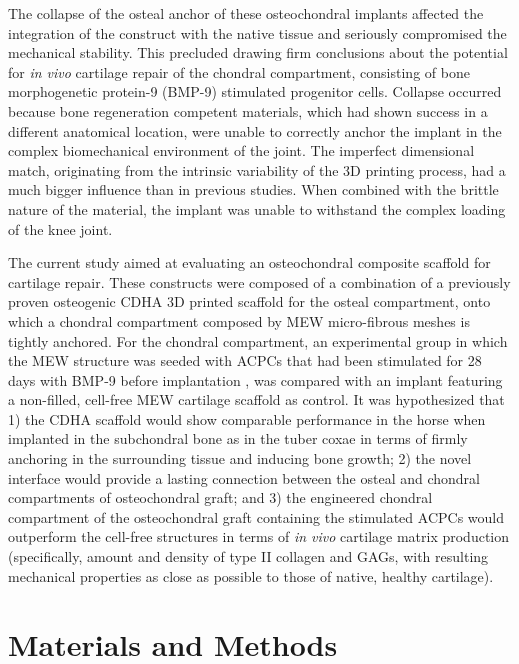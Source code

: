 \documentclass[twocolumn, empirical, authordate, issue]{jote-new-article}
\begin{document}
\begin{takeHomeMessage}
The collapse of the osteal anchor of these osteochondral implants affected the integration of the construct with the native tissue and seriously compromised the mechanical stability. This precluded drawing firm conclusions about the potential for \emph{in vivo} cartilage repair of the chondral compartment, consisting of bone morphogenetic protein-9 (BMP-9) stimulated progenitor cells. Collapse occurred because bone regeneration competent materials, which had shown success in a different anatomical location, were unable to correctly anchor the implant in the complex biomechanical environment of the joint. The imperfect dimensional match, originating from the intrinsic variability of the 3D printing process, had a much bigger influence than in previous studies. When combined with the brittle nature of the material, the implant was unable to withstand the complex loading of the knee joint.
\end{takeHomeMessage}
The current study aimed at evaluating an osteochondral composite scaffold for cartilage repair. These constructs were composed of a combination of a previously proven osteogenic CDHA 3D printed scaffold for the osteal compartment, onto which a chondral compartment composed by MEW micro-fibrous meshes is tightly anchored. For the chondral compartment, an experimental group in which the MEW structure was seeded with ACPCs that had been stimulated for 28 days with BMP-9 before implantation \parencite{Abinzano2018}, was compared with an implant featuring a non-filled, cell-free MEW cartilage scaffold as control. It was hypothesized that 1) the CDHA scaffold would show comparable performance in the horse when implanted in the subchondral bone as in the tuber coxae in terms of firmly anchoring in the surrounding tissue and inducing bone growth; 2) the novel interface would provide a lasting connection between the osteal and chondral compartments of osteochondral graft; and 3) the engineered chondral compartment of the osteochondral graft containing the stimulated ACPCs would outperform the cell-free structures in terms of \emph{in vivo} cartilage matrix production (specifically, amount and density of type II collagen and GAGs, with resulting mechanical properties as close as possible to those of native, healthy cartilage).

\section{Materials and Methods} 
\end{document}
